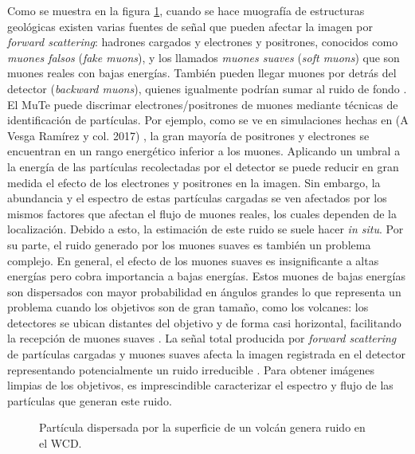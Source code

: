 \documentclass[12pt]{report}
\begin{document}
Como se muestra en la figura \ref{fig:scatteredNoise}, cuando se hace muografía de estructuras geológicas existen varias fuentes de señal que pueden afectar la imagen por \textit{forward scattering}: hadrones cargados y electrones y positrones, conocidos como \textit{muones falsos} (\textit{fake muons}), y los llamados \textit{muones suaves} (\textit{soft muons}) que son muones reales con bajas energías. También pueden llegar muones por detrás del detector (\textit{backward muons}), quienes igualmente podrían sumar al ruido de fondo \cite{bonechi2020atmospheric}. El MuTe puede discrimar electrones/positrones de muones mediante técnicas de identificación de partículas. Por ejemplo, como se ve en simulaciones hechas en (A Vesga Ramírez y col. 2017) \cite{asorey2017muon}, la gran mayoría de positrones y electrones se encuentran en un rango energético inferior a los muones. Aplicando un umbral a la energía de las partículas recolectadas por el detector se puede reducir en gran medida el efecto de los electrones y positrones en la imagen. Sin embargo, la abundancia y el espectro de estas partículas cargadas se ven afectados por los mismos factores que afectan el flujo de muones reales, los cuales dependen de la localización. Debido a esto, la estimación de este ruido se suele hacer \textit{in situ}. Por su parte, el ruido generado por los muones suaves es también un problema complejo. En general, el efecto de los muones suaves es insignificante a altas energías pero cobra importancia a bajas energías. Estos muones de bajas energías son dispersados con mayor probabilidad en ángulos grandes lo que representa un problema cuando los objetivos son de gran tamaño, como los volcanes: los detectores se ubican distantes del objetivo y de forma casi horizontal, facilitando la recepción de muones suaves \cite{bonechi2020atmospheric}. La señal total producida por \textit{forward scattering} de partículas cargadas y muones suaves afecta la imagen registrada en el detector representando potencialmente un ruido irreducible \cite{gomez2017forward}. Para obtener imágenes limpias de los objetivos, es imprescindible caracterizar el espectro y flujo de las partículas que generan este ruido.

\begin{figure}
    \centering
    
    \caption{Partícula dispersada por la superficie de un volcán genera ruido en el WCD.}
    \label{fig:scatteredNoise}
\end{figure}
\end{document}
